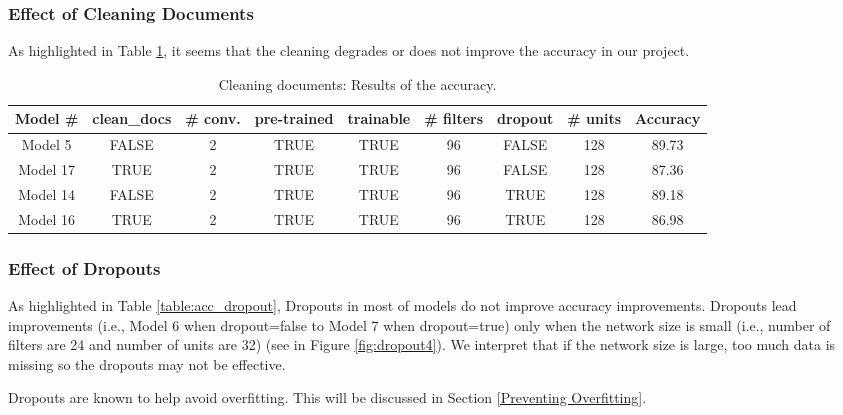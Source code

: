 \documentclass[11pt]{article}
\begin{document}
\subsubsection{Effect of Cleaning Documents}

As highlighted in Table \ref{table:acc_cleandocu},
it seems that the cleaning degrades or does not improve the accuracy in our project.

\begin{table}[h]
\centering
\begin{tabular}{||c|c|c|c|c|c|c|c|c||}
\hline
Model \# & clean\_docs &	\# conv.	& pre-trained &	trainable &	\# filters	& dropout &	\# units & Accuracy\\
\hline
Model 5	&	\cellcolor{yellow!25}FALSE	&	2	&	TRUE	&	TRUE	&	96	&	FALSE	&	128	&	89.73\\
\hline
Model	17	&	\cellcolor{blue!25}TRUE	&	2	&	TRUE	&	TRUE	&	96	&	FALSE	&	128	&	\cellcolor{blue!25}87.36	\\
\hline
\hline
Model	14	&	\cellcolor{yellow!25}FALSE	&	2	&	TRUE	&	TRUE	&	96	&	TRUE	&	128	&	89.18	\\
\hline
Model	16	&	\cellcolor{blue!25}TRUE	&	2	&	TRUE	&	TRUE	&	96	&	TRUE	&	128	&	\cellcolor{blue!25}86.98	\\
\hline
\end{tabular}
\caption{Cleaning documents: Results of the accuracy.}
\label{table:acc_cleandocu}
\end{table}


\subsubsection{Effect of Dropouts}
\label{Effect of Dropouts}

As highlighted in Table \ref{table:acc_dropout}, Dropouts in most of models do not improve accuracy improvements. Dropouts lead improvements (i.e., Model 6 when dropout=false to Model 7 when dropout=true) only when the network size is small (i.e., number of filters are 24 and number of units are 32) (see in Figure \ref{fig:dropout4}). We interpret that if the network size is large, too much data is missing so the dropouts may not be effective.

Dropouts are known to help avoid overfitting. This will be discussed in Section \ref{Preventing Overfitting}.
\end{document}
